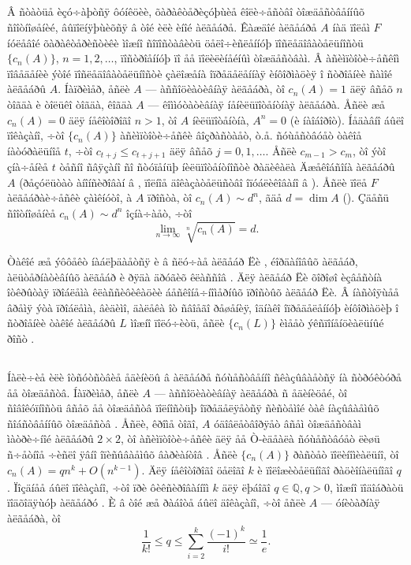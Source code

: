 \documentclass{article}
\numberwithin{equation}{section}
\theoremstyle{plain}
\theoremstyle{definition}
\begin{document}
\begin{fulltext}
\subsection{}\label{s1.1}
Â ñòàòüå èçó÷àþòñÿ ôóíêöèè, õàðàêòåðèçóþùèå êîëè÷åñòâî òîæäåñòâåííûõ ñîîòíîøåíèé,
âûïîëíÿþùèõñÿ â òîé èëè èíîé àëãåáðå. Êàæäîé àëãåáðå $A$ íàä ïîëåì $F$ íóëåâîé
õàðàêòåðèñòèêè ìîæíî ñîïîñòàâèòü öåëî÷èñëåííóþ ïîñëåäîâàòåëüíîñòü $\{c_n(A)\}$,
$n=1,2,\ldots$, ïîñòðîåííóþ ïî åå ïîëèëèíåéíûì òîæäåñòâàì. Â àñèìïòîòè÷åñêîì ïîâåäåíèè
ýòîé ïîñëåäîâàòåëüíîñòè çàëîæåíà îïðåäåëåííàÿ èíôîðìàöèÿ î ñòðîåíèè ñàìîé àëãåáðû
$A$. Íàïðèìåð, åñëè $A$ --- àññîöèàòèâíàÿ àëãåáðà, òî $c_n(A)=1$ äëÿ âñåõ $n$
òîãäà è òîëüêî òîãäà, êîãäà $A$ --- êîììóòàòèâíàÿ íåíèëüïîòåíòíàÿ àëãåáðà. Åñëè æå
$c_n(A)=0$ äëÿ íåêîòîðîãî $n>1$, òî $A$ íèëüïîòåíòíà, $A^n=0$ (è íàîáîðîò). Íåäàâíî 
áûëî ïîêàçàíî, ÷òî $\{c_n(A)\}$ àñèìïòîòè÷åñêè âîçðàñòàåò, ò.å. ñóùåñòâóåò òàêîå
íàòóðàëüíîå $t$, ÷òî $c_{t+j}\le c_{t+j+1}$ äëÿ âñåõ $j=0,1,\ldots$. Åñëè 
$c_{m-1}> c_m$, òî ýòî çíà÷åíèå $t$ òåñíî ñâÿçàíî ñî ñòóïåíüþ íèëüïîòåíòíîñòè 
ðàäèêàëà Äæåêîáñîíà àëãåáðû $A$ (ðåçóëüòàò àíîíñèðîâàí â \cite{GZ1}, ïîëíîå
äîêàçàòåëüñòâî îïóáëèêîâàíî â \cite{GZ2}). Åñëè ïîëå $F$ àëãåáðàè÷åñêè çàìêíóòî,
à $A$ ïðîñòà, òî $c_n(A) \sim d^n$, ãäå $d=\dim A$ (\cite{R}). Çäåñü ñîîòíîøåíèå
$c_n(A) \sim d^n$ îçíà÷àåò, ÷òî
$$
\lim_{n\to\infty} \sqrt[n]{c_n(A)}=d.
$$

Òàêîé æå ýôôåêò íàáëþäàåòñÿ è â ñëó÷àå àëãåáð Ëè \cite{Z}, éîðäàíîâûõ àëãåáð,
àëüòåðíàòèâíûõ àëãåáð è ðÿäà äðóãèõ êëàññîâ \cite{GSZ}. Äëÿ àëãåáð Ëè õîðîøî èçâåñòíà 
îòêðûòàÿ ïðîáëåìà êëàññèôèêàöèè áåñêîíå÷íîìåðíûõ ïðîñòûõ àëãåáð Ëè. Â íàñòîÿùåå
âðåìÿ ýòà ïðîáëåìà, âèäèìî, äàëåêà îò ñâîåãî ðåøåíèÿ, îäíàêî îïðåäåëåííóþ
èíôîðìàöèþ î ñòðîåíèè òàêîé àëãåáðû $L$ ìîæíî ïîëó÷èòü, åñëè $\{c_n(L)\}$ èìååò
ýêñïîíåíöèàëüíûé ðîñò \cite{Rzm}.

\subsection{}\label{s1.2}
Íàëè÷èå èëè îòñóòñòâèå åäèíèöû â àëãåáðå ñóùåñòâåííî ñêàçûâàåòñÿ íà ñòðóêòóðå åå
òîæäåñòâ. Íàïðèìåð, åñëè $A$ --- àññîöèàòèâíàÿ àëãåáðà ñ åäèíèöåé, òî ñîâîêóïíîñòü
âñåõ åå òîæäåñòâ ïîëíîñòüþ îïðåäåëÿåòñÿ ñèñòåìîé òàê íàçûâàåìûõ ñîáñòâåííûõ
òîæäåñòâ \cite{Sp}. Åñëè, êðîìå òîãî, $A$ óäîâëåòâîðÿåò âñåì òîæäåñòâàì ìàòðè÷íîé 
àëãåáðû $2\times 2$, òî àñèìïòîòè÷åñêè äëÿ åå Ò-èäåàëà ñóùåñòâóåò ëèøü ñ÷åòíîå ÷èñëî
ÿâíî îïèñûâàåìûõ âàðèàíòîâ \cite{K}. Åñëè $\{c_n(A)\}$ ðàñòåò ïîëèíîìèàëüíî, òî
$c_n(A)= qn^k + O(n^{k-1})$. Äëÿ íåêîòîðîãî öåëîãî $k$ è ïîëîæèòåëüíîãî ðàöèîíàëüíîãî
$q$ \cite{D}. Ïîçäíåå áûëî ïîêàçàíî, ÷òî ïðè ôèêñèðîâàííîì $k$ äëÿ ëþáîãî
$q\in\mathbb{Q}, q>0$, ìîæíî ïîäîáðàòü ïîäõîäÿùóþ àëãåáðó \cite{DR}. È â òîé æå ðàáîòå
áûëî äîêàçàíî, ÷òî åñëè $A$ --- óíèòàðíàÿ àëãåáðà, òî
$$
\frac{1}{k!}\le q \le \sum_{i=2}^k \frac{(-1)^k}{i!} \simeq \frac{1}{e}.
$$


\end{fulltext}
\end{document}
